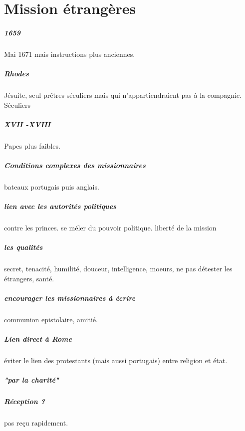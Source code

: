 \chapter{Mission étrangères}


\paragraph{1659} Mai 1671 mais instructions plus anciennes. 

\paragraph{Rhodes} Jésuite, seul prêtres séculiers mais qui n'appartiendraient pas à la compagnie. Séculiers

\paragraph{XVII -XVIII} Papes plus faibles. 

\paragraph{Conditions complexes des missionnaires} bateaux portugais puis anglais. 

\paragraph{lien avec les autorités politiques} contre les princes. se méler du pouvoir politique. liberté de la mission

\paragraph{les qualités} secret, tenacité, humilité, douceur, intelligence, moeurs, ne pas détester les étrangers, santé.

\paragraph{encourager les missionnaires à écrire} communion epistolaire, amitié. 

\paragraph{Lien direct à Rome} éviter le lien des protestants (mais aussi portugais) entre religion et état. 

\paragraph{"par la charité"}

\paragraph{Réception ? } pas reçu rapidement.

